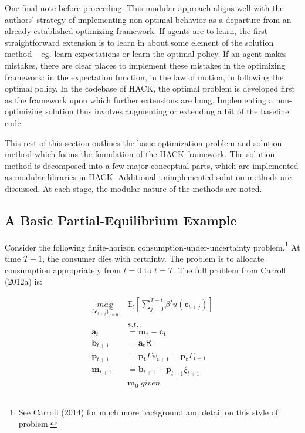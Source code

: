 \documentclass[]{article}
\begin{document}
One final note before proceeding\href{continuing}{}. This modular
approach aligns well with the authors' strategy of implementing
non-optimal behavior as a departure from an already-established
optimizing framework. If agents are to learn, the first straightforward
extension is to learn in about some element of the solution method --
eg. learn expectations or learn the optimal policy. If an agent makes
mistakes, there are clear places to implement these mistakes in the
optimizing framework: in the expectation function, in the law of motion,
in following the optimal policy. In the codebase of HACK, the optimal
problem is developed first as the framework upon which further
extensions are hung. Implementing a non-optimizing solution thus
involves augmenting or extending a bit of the baseline code.
\href{replaces\%20depart\%20and\%20then\%20portions\%20of\%20the\%20solution\%20are}{}
\href{belief\%20that\%20the\%20most\%20straightforward\%20way\%20to\%20implement\%20non-optimizing\%20behavior\%20in\%20an\%20economic\%20model\%20is\%20through\%20specific\%20departures\%20from\%20an\%20already-established\%20optimizing\%20framework.}{}

This rest of this section outlines the basic optimization problem and
solution method which forms the foundation of the HACK framework. The
solution method is decomposed into a few major conceptual parts, which
are implemented as modular libraries in HACK. Additional unimplemented
solution methods are discussed. At each stage, the modular nature of the
methods are noted. \href{CONFIRM}{}

\subsection{A Basic Partial-Equilibrium
Example}\label{a-basic-partial-equilibrium-example}

Consider the following finite-horizon consumption-under-uncertainty
problem.\footnote{See Carroll (2014) for much more background and detail
  on this style of problem.} At time $T+1$, the consumer dies with
certainty. The problem is to allocate consumption appropriately from
$t=0$ to $t=T$. The full problem from Carroll (2012a) is: \href{REF}{}

\[
\begin{aligned}
\underset{\{\mathbf{c}_{t+j} \} _{j=0} ^{\infty} }{max} \; & \mathbb{E}_{t} \left[ \sum _{j=0} ^{T-t} \beta^{j} u(\mathbf{c}_{t+j}) \right] \\
& s.t. \\
\mathbf{a}_{t} & = \mathbf{m_t} - \mathbf{c_t} \\
\mathbf{b}_{t+1} & = \mathbf{a_t}\mathsf{R} \\
\mathbf{p}_{t+1} & = \mathbf{p_
t} \Gamma \psi_{t+1} = \mathbf{p_t} \Gamma_{t+1} \\
\mathbf{m}_{t+1} & = \mathbf{b}_{t+1} + \mathbf{p}_{t+1} \xi_{t+1} \\
& \mathbf{m}_0\;given
\end{aligned}
\]
\end{document}
